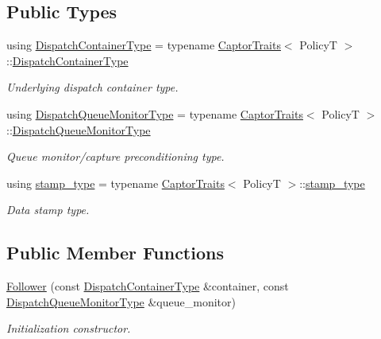 \subsection*{Public Types}
\begin{DoxyCompactItemize}
\item 
\mbox{\label{classflow_1_1_follower_a2c30490de514f45d9cc287eb8baed5db}} 
using \hyperlink{classflow_1_1_follower_a2c30490de514f45d9cc287eb8baed5db}{Dispatch\+Container\+Type} = typename \hyperlink{structflow_1_1_captor_traits}{Captor\+Traits}$<$ PolicyT $>$\+::\hyperlink{classflow_1_1_follower_a2c30490de514f45d9cc287eb8baed5db}{Dispatch\+Container\+Type}
\begin{DoxyCompactList}\small\item\em Underlying dispatch container type. \end{DoxyCompactList}\item 
\mbox{\label{classflow_1_1_follower_aa19997fc64e57b6603f167144927de45}} 
using \hyperlink{classflow_1_1_follower_aa19997fc64e57b6603f167144927de45}{Dispatch\+Queue\+Monitor\+Type} = typename \hyperlink{structflow_1_1_captor_traits}{Captor\+Traits}$<$ PolicyT $>$\+::\hyperlink{classflow_1_1_follower_aa19997fc64e57b6603f167144927de45}{Dispatch\+Queue\+Monitor\+Type}
\begin{DoxyCompactList}\small\item\em Queue monitor/capture preconditioning type. \end{DoxyCompactList}\item 
\mbox{\label{classflow_1_1_follower_a1388657aef71e23dd17a18ed7c628ae0}} 
using \hyperlink{classflow_1_1_follower_a1388657aef71e23dd17a18ed7c628ae0}{stamp\+\_\+type} = typename \hyperlink{structflow_1_1_captor_traits}{Captor\+Traits}$<$ PolicyT $>$\+::\hyperlink{classflow_1_1_follower_a1388657aef71e23dd17a18ed7c628ae0}{stamp\+\_\+type}
\begin{DoxyCompactList}\small\item\em Data stamp type. \end{DoxyCompactList}\end{DoxyCompactItemize}
\subsection*{Public Member Functions}
\begin{DoxyCompactItemize}
\item 
\hyperlink{classflow_1_1_follower_a3355c5acbcb1daea2fbe8e0c39f7b558}{Follower} (const \hyperlink{classflow_1_1_follower_a2c30490de514f45d9cc287eb8baed5db}{Dispatch\+Container\+Type} \&container, const \hyperlink{classflow_1_1_follower_aa19997fc64e57b6603f167144927de45}{Dispatch\+Queue\+Monitor\+Type} \&queue\+\_\+monitor)
\begin{DoxyCompactList}\small\item\em Initialization constructor. \end{DoxyCompactList}\end{DoxyCompactItemize}
